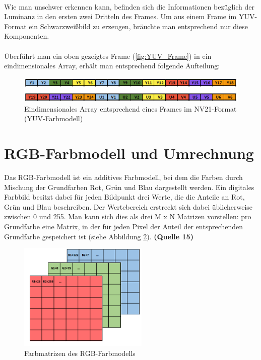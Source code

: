 ~\\
Wie man unschwer erkennen kann, befinden sich die Informationen bezüglich der Luminanz in den ersten zwei Dritteln des Frames. Um aus einem Frame im YUV-Format ein Schwarzweißbild zu erzeugen, bräuchte man entsprechend nur diese Komponenten. 
\\
\\
Überführt man ein oben gezeigtes Frame (\ref{fig:YUV_Frame}) in ein eindimensionales Array, erhält man entsprechend folgende Aufteilung: 

\begin{figure}[h]
	\centering
	\includegraphics[width=1\textwidth]{Bilder/Materialien_und_Grundlagen/YUV_Array.PNG}
	\caption{Eindimensionales Array entsprechend eines Frames im NV21-Format (YUV-Farbmodell)}
	\label{fig:YUV_Array}
\end{figure}

\section{RGB-Farbmodell und Umrechnung} \label{YUV_RGBKonvert}

Das RGB-Farbmodell ist ein additives Farbmodell, bei dem die Farben durch Mischung der Grundfarben Rot, Grün und Blau dargestellt werden. Ein digitales Farbbild besitzt dabei für jeden Bildpunkt drei Werte, die die Anteile an Rot, Grün und Blau beschreiben. Der Wertebereich erstreckt sich dabei üblicherweise zwischen 0 und 255. Man kann sich dies als drei M x N Matrizen vorstellen: pro Grundfarbe eine Matrix, in der für jeden Pixel der Anteil der entsprechenden Grundfarbe gespeichert ist (siehe Abbildung \ref{fig:RGB-Matrizen}). \textbf{(Quelle 15)}

\clearpage

\begin{figure}[h]
	\centering
	\includegraphics[width=0.55\textwidth]{Bilder/Materialien_und_Grundlagen/RGB_Matritzen2.png}
	\caption{Farbmatrizen des RGB-Farbmodells}
	\label{fig:RGB-Matrizen}
\end{figure}

